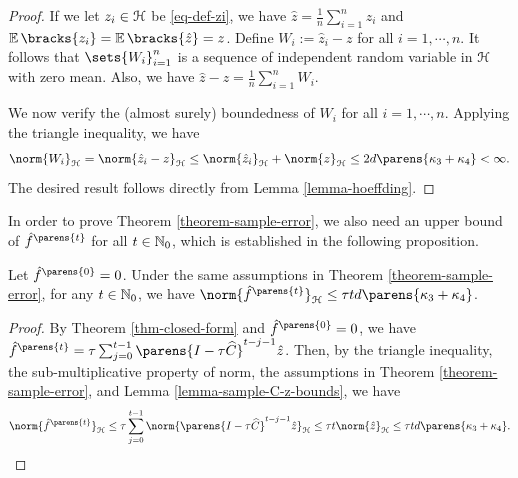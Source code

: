 \begin{proof}
	If we let $z_i \in \mathcal{H}$ be \eqref{eq-def-zi}, we have $\hat{z} = \frac{1}{n} \sum_{i=1}^n z_i$ and $\E \bracks{z_i} = \E \bracks{\hat{z}} = z$. Define $W_i := \hat{z}_i - z$ for all $i = 1, \cdots, n$. It follows that $\sets{W_i}_{i=1}^n$ is a sequence of independent random variable in $\mathcal{H}$ with zero mean. Also, we have $\hat{z} - z = \frac{1}{n}\sum_{i=1}^n W_i$. 
	
	We now verify the (almost surely) boundedness of $W_i$ for all $i = 1, \cdots, n$. Applying the triangle inequality, we have 
	\begin{align*}
		\norm{W_i}_{\hil} = \norm{\hat{z}_i - z}_{\hil} \le \norm{\hat{z}_i}_{\hil} + \norm{z}_{\hil} \le 2d \parens{\kappa_3 + \kappa_4} < \infty. 
	\end{align*}
	The desired result follows directly from Lemma \ref{lemma-hoeffding}. 
\end{proof}

In order to prove Theorem \ref{theorem-sample-error}, we also need an upper bound of $\hat{f}^{\parens{t}}$ for all $t \in \mathbb{N}_0$, which is established in the following proposition. 

\begin{proposition}\label{prop-ft}
	Let $\hat{f}^{\parens{0}} = 0$. Under the same assumptions in Theorem \ref{theorem-sample-error}, for any $t \in \mathbb{N}_0$, we have $\norm{\hat{f}^{\parens{t}}}_{\calH} \le \tau t d \parens{\kappa_3 + \kappa_4}$. 
\end{proposition}

\begin{proof}
	By Theorem \ref{thm-closed-form} and $\hat{f}^{\parens{0}} = 0$, we have $\hat{f}^{\parens{t}} = \tau \sum_{j=0}^{t-1} \parens{I - \tau \widehat{C}}^{t-j-1} \hat{z}$. Then, by the triangle inequality, the sub-multiplicative property of norm, the assumptions in Theorem \ref{theorem-sample-error}, and Lemma \ref{lemma-sample-C-z-bounds}, we have 
	\begin{align*}
		\norm{\hat{f}^{\parens{t}}}_{\calH} \le \tau \sum_{j=0}^{t-1} \norm{\parens{I - \tau \widehat{C}}^{t-j-1} \hat{z}}_{\calH} \le \tau t \norm{\hat{z}}_{\hil} \le \tau t d \parens{\kappa_3 + \kappa_4}. 
	\end{align*}
\end{proof}

